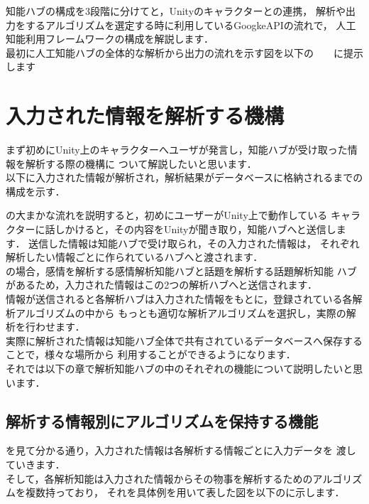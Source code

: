知能ハブの構成を3段階に分けてと，Unityのキャラクターとの連携，
解析や出力をするアルゴリズムを選定する時に利用しているGoogkeAPIの流れで，
人工知能利用フレームワークの構成を解説します．
\\
最初に人工知能ハブの全体的な解析から出力の流れを示す図を以下の　　に提示します
\section{入力された情報を解析する機構}
まず初めにUnity上のキャラクターへユーザが発言し，知能ハブが受け取った情報を解析する際の機構に
ついて解説したいと思います．\\

以下に入力された情報が解析され，解析結果がデータベースに格納されるまでの
構成を示す．

の大まかな流れを説明すると，初めにユーザーがUnity上で動作している
キャラクターに話しかけると，その内容をUnityが聞き取り，知能ハブへと送信します．
送信した情報は知能ハブで受け取られ，その入力された情報は，
それぞれ解析したい情報ごとに作られているハブへと渡されます．\\
の場合，感情を解析する感情解析知能ハブと話題を解析する話題解析知能
ハブがあるため，入力された情報はこの2つの解析ハブへと送信されます．\\

情報が送信されると各解析ハブは入力された情報をもとに，登録されている各解析アルゴリズムの中から
もっとも適切な解析アルゴリズムを選択し，実際の解析を行わせます．\\

実際に解析された情報は知能ハブ全体で共有されているデータベースへ保存することで，様々な場所から
利用することができるようになります．\\

それでは以下の章で解析知能ハブの中のそれぞれの機能について説明したいと思います．


\subsection{解析する情報別にアルゴリズムを保持する機能}
を見て分かる通り，入力された情報は各解析する情報ごとに入力データを
渡していきます．\\
そして，各解析知能は入力された情報からその物事を解析するためのアルゴリズムを複数持っており，
それを具体例を用いて表した図を以下のに示します．

